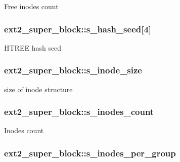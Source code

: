 \-Free inodes count \hypertarget{structext2__super__block_a70910c5d87977d65b2a69fb7b079d3a1}{
\subsubsection[{s\-\_\-hash\-\_\-seed}]{ {\bf ext2\-\_\-super\-\_\-block\-::s\-\_\-hash\-\_\-seed}\mbox{[}4\mbox{]}}}\label{structext2__super__block_a70910c5d87977d65b2a69fb7b079d3a1}
\-H\-T\-R\-E\-E hash seed \hypertarget{structext2__super__block_a9a1ee9cd5f706fa2e753a4c781ebae73}{
\subsubsection[{s\-\_\-inode\-\_\-size}]{ {\bf ext2\-\_\-super\-\_\-block\-::s\-\_\-inode\-\_\-size}}}\label{structext2__super__block_a9a1ee9cd5f706fa2e753a4c781ebae73}
size of inode structure \hypertarget{structext2__super__block_a2ea20f821c0ddc19b0adc7d1b8d0685d}{
\subsubsection[{s\-\_\-inodes\-\_\-count}]{ {\bf ext2\-\_\-super\-\_\-block\-::s\-\_\-inodes\-\_\-count}}}\label{structext2__super__block_a2ea20f821c0ddc19b0adc7d1b8d0685d}
\-Inodes count \hypertarget{structext2__super__block_a4b417c308a43cfd8d744c3fdd19832af}{
\subsubsection[{s\-\_\-inodes\-\_\-per\-\_\-group}]{ {\bf ext2\-\_\-super\-\_\-block\-::s\-\_\-inodes\-\_\-per\-\_\-group}}}\label{structext2__super__block_a4b417c308a43cfd8d744c3fdd19832af}
